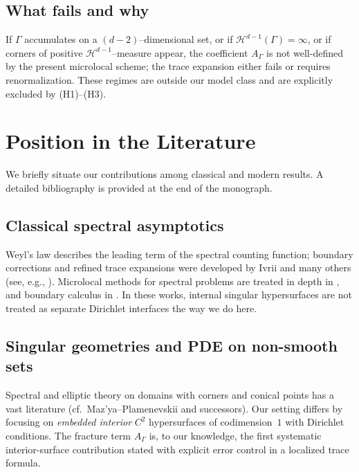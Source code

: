 \subsection{What fails and why}
\label{sub:intro-what-fails}

If $\Gamma$ accumulates on a $(d-2)$–dimensional set, or if
$\mathcal{H}^{d-1}(\Gamma)=\infty$, or if corners of positive
$\mathcal{H}^{d-1}$–measure appear, the coefficient $A_\Gamma$ is not
well-defined by the present microlocal scheme; the trace expansion either
fails or requires renormalization. These regimes are outside our model class
and are explicitly excluded by (H1)–(H3).


\section{Position in the Literature}
\label{sec:intro-literature}

We briefly situate our contributions among classical and modern results.
A detailed bibliography is provided at the end of the monograph.

\subsection{Classical spectral asymptotics}
\label{sub:intro-classical}

Weyl’s law describes the leading term of the spectral counting function;
boundary corrections and refined trace expansions were developed by
Ivrii and many others (see, e.g., \cite{Weyl1911,Ivrii1980}).
Microlocal methods for spectral problems are treated in depth in
\cite{Hormander1971,SafarovVassiliev1997}, and boundary calculus in
\cite{Melrose1996}. In these works, internal singular hypersurfaces are not
treated as separate Dirichlet interfaces the way we do here.

\subsection{Singular geometries and PDE on non-smooth sets}
\label{sub:intro-singular}

Spectral and elliptic theory on domains with corners and conical points
has a vast literature (cf.\ Maz'ya–Plamenevskii and successors). Our setting
differs by focusing on \emph{embedded interior} $C^2$ hypersurfaces of
codimension~$1$ with Dirichlet conditions. The fracture term $A_\Gamma$ is,
to our knowledge, the first systematic interior-surface contribution stated
with explicit error control in a localized trace formula.


